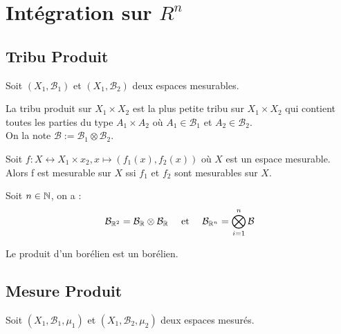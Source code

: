 \chapter{Intégration sur $R^n$}

\setlength{\parindent}{0pt}
\renewcommand{\labelitemi}{\textbullet} %

% 

\section{Tribu Produit}

Soit $(X_1,\mathcal{B}_1)$ et $(X_1,\mathcal{B}_2)$ deux espaces mesurables. 

\begin{definition}
    La tribu produit sur $X_1 \times X_2$ est la plus petite tribu sur $X_1 \times X_2$ qui contient toutes les 
    parties du type $A_1 \times A_2$ où $A_1 \in \mathcal{B}_1$ et $A_2 \in \mathcal{B}_2$. \\
    On la note $ \mathcal{B} := \mathcal{B}_1 \otimes \mathcal{B}_2$. 
\end{definition}

\begin{prop}
    Soit $f : X \longleftrightarrow X_1 \times x_2, x \longmapsto (f_1(x),f_2(x))$ où $X$ est un espace mesurable. \\
    Alors f est mesurable sur $X$ ssi $f_1$ et $f_2$ sont mesurables sur $X$. 
\end{prop}

\begin{theorem}
    Soit $n \in \mathbb{N}$, on a :
    \[ \mathcal{B}_{\mathbb{R}^2} = \mathcal{B}_{\mathbb{R}} \otimes \mathcal{B}_{\mathbb{R}} \quad \text{ et } \quad \mathcal{B}_{\mathbb{R}^n} = \bigotimes_{i=1}^n \mathcal{B} \] 
\end{theorem}

\begin{corollary}
    Le produit d'un borélien est un borélien. 
\end{corollary}

\section{Mesure Produit}

Soit $(X_1,\mathcal{B}_1,\mu_1)$ et $(X_1,\mathcal{B}_2,\mu_2)$ deux espaces mesurés. 

